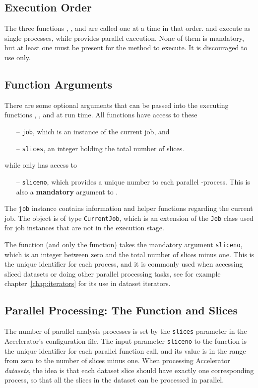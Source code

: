 \subsection{Execution Order}
The three functions \prepare, \analysis, and \synthesis are called one
at a time in that order.  \prepare and \synthesis execute as single
processes, while \analysis provides parallel execution.  None of them
is mandatory, but at least one must be present for the method to
execute.  It is discouraged to use \prepare only.



\subsection{Function Arguments}
There are some optional arguments that can be passed into the
executing functions \prepare, \analysis, and \synthesis at run time.
All functions have access to these
\begin{itemize}
\item[--] \texttt{job}, which is an instance of the current job, and
\item[--] \texttt{slices}, an integer holding the total number of slices.
\end{itemize}
while only \analysis has access to
\begin{itemize}
\item[--] \texttt{sliceno}, which provides a unique number to each
  parallel \analysis-process.  This is also a \textbf{mandatory}
  argument to \analysis.
\end{itemize}
The \texttt{job} instance contains information and helper functions
regarding the current job.  The object is of type \texttt{CurrentJob},
which is an extension of the \texttt{Job} class used for job instances
that are not in the execution stage.

The \analysis function (and only the \analysis function) takes the
mandatory argument \texttt{sliceno}, which is an integer between zero
and the total number of slices minus one.  This is the unique
identifier for each \analysis process, and it is commonly used when
accessing sliced datasets or doing other parallel processing tasks,
see for example chapter~\ref{chap:iterators} for its use in dataset
iterators.



\subsection{Parallel Processing:  The \analysis Function and Slices}
The number of parallel analysis processes is set by the
\texttt{slices} parameter in the Accelerator's configuration file.
The input parameter \texttt{sliceno} to the \analysis function is the
unique identifier for each parallel function call, and its value is in
the range from zero to the number of slices minus one.  When
processing Accelerator \textsl{datasets}, the idea is that each
dataset slice should have exactly one corresponding \analysis process,
so that all the slices in the dataset can be processed in parallel.


